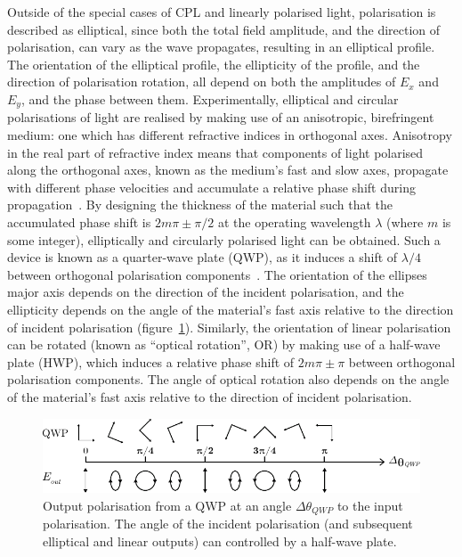 Outside of the special cases of CPL and linearly polarised light, polarisation is described as elliptical, since both the total field amplitude, and the direction of polarisation, can vary as the wave propagates, resulting in an elliptical profile. The orientation of the elliptical profile, the ellipticity of the profile, and the direction of polarisation rotation, all depend on both the amplitudes of $E_x$ and $E_y$, and the phase between them.
Experimentally, elliptical and circular polarisations of light are realised by making use of an anisotropic, birefringent medium: one which has different refractive indices in orthogonal axes. Anisotropy in the real part of refractive index means that components of light polarised along the orthogonal axes, known as the medium's fast and slow axes, propagate with different phase velocities and accumulate a relative phase shift during propagation~\cite[\S 2.4]{fox2002optical}. By designing the thickness of the material such that the accumulated phase shift is $2m\pi \pm \pi/2$ at the operating wavelength $\lambda$ (where $m$ is some integer), elliptically and circularly polarised light can be obtained. Such a device is known as a quarter-wave plate (QWP), as it induces a shift of $\lambda/4$ between orthogonal polarisation components~\cite[\S 8.7.1]{Hecht2013}. The orientation of the ellipses major axis depends on the direction of the incident polarisation, and the ellipticity depends on the angle of the material's fast axis relative to the direction of incident polarisation (figure~\ref{fig:background:Chirality:QWP}). Similarly, the orientation of linear polarisation can be rotated (known as ``optical rotation'', OR) by making use of a half-wave plate (HWP), which induces a relative phase shift of $2m\pi \pm \pi$ between orthogonal polarisation components. The angle of optical rotation also depends on the angle of the material's fast axis relative to the direction of incident polarisation.
\begin{figure}[htb!]
    \centering
    \includegraphics[scale=1.0]{./figures/background/chiroptics/QWP_in_out.pdf}
    \caption{\label{fig:background:Chirality:QWP}Output polarisation from a QWP at an angle $\Delta\theta_{QWP}$ to the input polarisation. The angle of the incident polarisation (and subsequent elliptical and linear outputs) can controlled by a half-wave plate.}
\end{figure}

